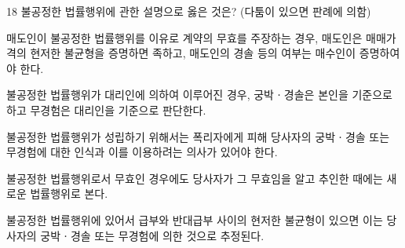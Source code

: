 \begin{question}{18}
불공정한 법률행위에 관한 설명으로 옳은 것은? (다툼이 있으면 판례에 의함)
\begin{choices}
  \item 매도인이 불공정한 법률행위를 이유로 계약의 무효를 주장하는 경우, 매도인은 매매가격의 현저한 불균형을 증명하면 족하고, 매도인의 경솔 등의 여부는 매수인이 증명하여야 한다.
  \item 불공정한 법률행위가 대리인에 의하여 이루어진 경우, 궁박ㆍ경솔은 본인을 기준으로 하고 무경험은 대리인을 기준으로 판단한다.
  \item 불공정한 법률행위가 성립하기 위해서는 폭리자에게 피해 당사자의 궁박ㆍ경솔 또는 무경험에 대한 인식과 이를 이용하려는 의사가 있어야 한다.
  \item 불공정한 법률행위로서 무효인 경우에도 당사자가 그 무효임을 알고 추인한 때에는 새로운 법률행위로 본다.
  \item 불공정한 법률행위에 있어서 급부와 반대급부 사이의 현저한 불균형이 있으면 이는 당사자의 궁박ㆍ경솔 또는 무경험에 의한 것으로 추정된다.
\end{choices}
\end{question}
